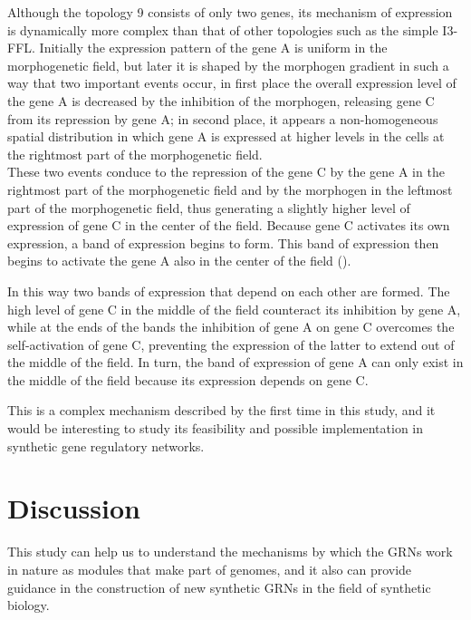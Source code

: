 \documentclass[10pt,letterpaper]{article}
\begin{document}
Although the topology 9 consists of only two genes, its mechanism of expression
is dynamically more complex than that of other topologies such as the simple
I3-FFL. Initially the expression pattern of the gene A is uniform in the
morphogenetic field, but later it is shaped by the morphogen gradient in such a
way that two important events occur, in first place the overall expression
level of the gene A is decreased by the inhibition of the morphogen, releasing
gene C from its repression by gene A; in second place, it appears a
non-homogeneous spatial distribution in which gene A is expressed at higher
levels in the cells at the rightmost part of the morphogenetic field.\\

These two events conduce to the repression of the gene C by the gene A in the
rightmost part of the morphogenetic field and by the morphogen in the leftmost
part of the morphogenetic field, thus generating a slightly higher level of
expression of gene C in the center of the field. Because gene C activates its
own expression, a band of expression begins to form. This band of expression
then begins to activate the gene A also in the center of the field
().


In this way two bands of expression that depend on each other are formed. The
high level of gene C in the middle of the field counteract its inhibition by
gene A, while at the ends of the bands the inhibition of gene A on gene C
overcomes the self-activation of gene C, preventing the expression of the
latter to extend out of the middle of the field. In turn, the band of
expression of gene A can only exist in the middle of the field because its
expression depends on gene C.

This is a complex mechanism described by the first time in this study, and it
would be interesting to study its feasibility and possible implementation in
synthetic gene regulatory networks.

\section*{Discussion}

This study can help us to understand the mechanisms by which the GRNs work in
nature as modules that make part of genomes, and it also can provide guidance
in the construction of new synthetic GRNs in the field of synthetic biology.
\end{document}

